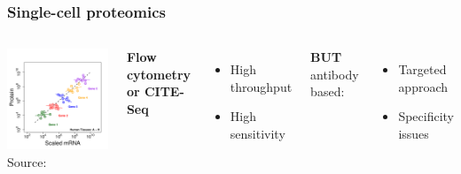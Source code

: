 \documentclass{beamer}
\begin{document}
\begin{frame}[c]
  \frametitle{Single-cell proteomics }
  
  \begin{columns}
  
    \includegraphics[width=\linewidth]{figs/simsons_paradox_in_gene_regulation.png}
    \footnotesize
    Source: \cite{Specht2018-hi}
    
    \pause
    \textbf{Flow cytometry or CITE-Seq}
    \begin{itemize}
      \item High throughput
      \item High sensitivity
    \end{itemize}
    \vspace{0.5cm}
    \textbf{BUT} antibody based:\\
    \begin{itemize}
      \item Targeted approach
      \item Specificity issues
    \end{itemize}
  
  \end{columns}
  
\end{frame}
\end{document}
